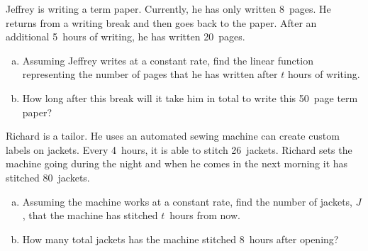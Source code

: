 \documentclass[11pt,letterpaper]{article}
\begin{document}

 Jeffrey is writing a term paper. Currently, he has only written 8~pages. He returns from a writing break and then goes back to the paper. After an additional 5~hours of writing, he has written 20~pages. 
	\begin{enumerate}[(a)]
	\item Assuming Jeffrey writes at a constant rate, find the linear function representing the number of pages that he has written after $t$ hours of writing. 
	\item How long after this break will it take him in total to write this 50~page term paper?
	\end{enumerate} 



\newpage



 Richard is a tailor. He uses an automated sewing machine can create custom labels on jackets. Every 4~hours, it is able to stitch 26~jackets. Richard sets the machine going during the night and when he comes in the next morning it has stitched 80~jackets.
	\begin{enumerate}[(a)]
	\item Assuming the machine works at a constant rate, find the number of jackets, $J$, that the machine has stitched $t$~hours from now.
	\item How many total jackets has the machine stitched 8~hours after opening?
	\end{enumerate} 
\end{document}

